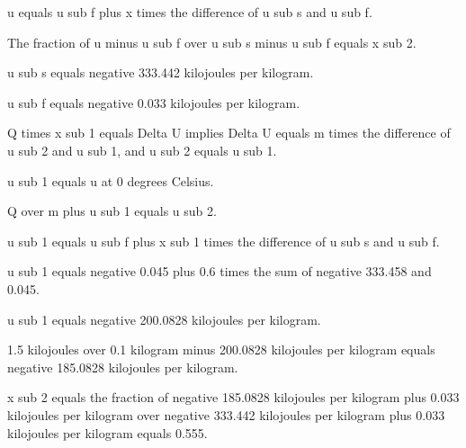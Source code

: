u equals u sub f plus x times the difference of u sub s and u sub f.

The fraction of u minus u sub f over u sub s minus u sub f equals x sub 2.

u sub s equals negative 333.442 kilojoules per kilogram.

u sub f equals negative 0.033 kilojoules per kilogram.

Q times x sub 1 equals Delta U implies Delta U equals m times the difference of u sub 2 and u sub 1, and u sub 2 equals u sub 1.

u sub 1 equals u at 0 degrees Celsius.

Q over m plus u sub 1 equals u sub 2.

u sub 1 equals u sub f plus x sub 1 times the difference of u sub s and u sub f.

u sub 1 equals negative 0.045 plus 0.6 times the sum of negative 333.458 and 0.045.

u sub 1 equals negative 200.0828 kilojoules per kilogram.

1.5 kilojoules over 0.1 kilogram minus 200.0828 kilojoules per kilogram equals negative 185.0828 kilojoules per kilogram.

x sub 2 equals the fraction of negative 185.0828 kilojoules per kilogram plus 0.033 kilojoules per kilogram over negative 333.442 kilojoules per kilogram plus 0.033 kilojoules per kilogram equals 0.555.